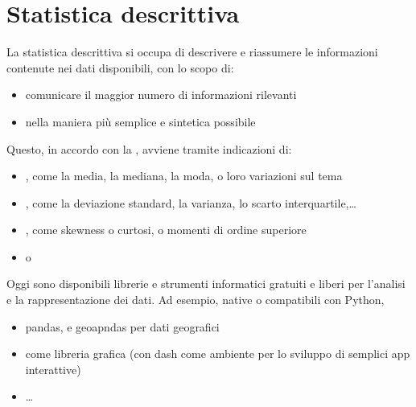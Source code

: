\documentclass[letterpaper,10pt,italian]{jupyterBook}
\begin{document}
\sphinxstepscope


\chapter{Statistica descrittiva}
\label{\detokenize{ch/statistics/descriptive:statistica-descrittiva}}\label{\detokenize{ch/statistics/descriptive:statistics-hs-descriptive}}\label{\detokenize{ch/statistics/descriptive::doc}}
\sphinxAtStartPar
La statistica descrittiva si occupa di descrivere e riassumere le informazioni contenute nei dati disponibili, con lo scopo di:
\begin{itemize}
\item {} 
\sphinxAtStartPar
comunicare il maggior numero di informazioni rilevanti

\item {} 
\sphinxAtStartPar
nella maniera più semplice e sintetica possibile

\end{itemize}

\sphinxAtStartPar
Questo, in accordo con la  , avviene tramite indicazioni di:
\begin{itemize}
\item {} 
\sphinxAtStartPar
{}, come la media, la mediana, la moda, o loro variazioni sul tema

\item {} 
\sphinxAtStartPar
{}, come la deviazione standard, la varianza, lo scarto interquartile,…

\item {} 
\sphinxAtStartPar
{}, come skewness o curtosi, o momenti di ordine superiore

\item {} 
\sphinxAtStartPar
{} o   

\end{itemize}

\sphinxAtStartPar
Oggi sono disponibili librerie e strumenti informatici gratuiti e liberi per l’analisi e la rappresentazione dei dati. Ad esempio, native o compatibili con Python,
\begin{itemize}
\item {} 
\sphinxAtStartPar
pandas, e geoapndas per dati geografici

\item {} 
\sphinxAtStartPar
{} come libreria grafica (con dash come ambiente per lo sviluppo di semplici app interattive)

\item {} 
\sphinxAtStartPar
…

\end{itemize}
\end{document}
